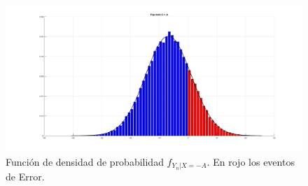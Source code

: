 \begin{figure}[H]
  \centering
  \includegraphics[width=1\textwidth]{images/fdp_X-A}
  \caption{Función de densidad de probabilidad $f_{Y_n|X=-A}$. En rojo los eventos de Error.}
  \label{fig:pto4_3b}
\end{figure}























